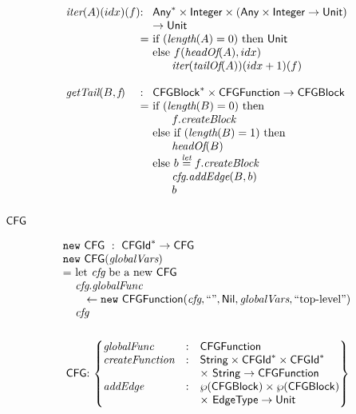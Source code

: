 \vspace*{-2em}
\[
\begin{array}{l@{}l@{~}l}
\iter(A)(idx)(f) & : & \Any^{*} \times \Integer \times (\Any \times \Integer \rightarrow \Unit)\\
&& \rightarrow \Unit\\
& = & \mbox{if}\ (\length(A) = 0)\ \mbox{then}\ \Unit \\
& & \mbox{else}\ f(\headOf(A), idx)\\
& & \phantom{else} \iter(\tailOf(A))(idx+1)(f)\\
& & \\

\getTail(B, \emph{f})\ & : & \CFGBlock^{*} \times  \CFGFunction \rightarrow \CFGBlock \\
& = & \mbox{if}\ (\length(B) = 0)\ \mbox{then}\\
& & \phantom{else} f.\emph{createBlock}\\
& & \mbox{else}\ \mbox{if}\ (\length(B) = 1)\ \mbox{then}\\
& & \phantom{else} \headOf(B) \\
& & \mbox{else}\ b \letval f.\emph{createBlock}\\
& & \phantom{else} \emph{cfg}.\emph{addEdge}(B, b)\\
& & \phantom{else} b\\
\end{array}
\]

\subsubsection{$\mbox{\textsf{CFG}}$}
\[
\begin{array}{l@{}l@{~}l}
\lefteqn{\new\ \CFG \ : \ \CFGId^{*} \rightarrow \CFG} \\
\lefteqn{\new\ \CFG(\emph{globalVars})}\\
& = & \text{let } \emph{cfg} \text{ be a new } \CFG\\
& & \emph{cfg}.\emph{globalFunc} \\
& & \quad \leftarrow \new\ \CFGFunction(\emph{cfg}, ``", \Nil, \emph{globalVars}, ``\text{top-level}")\\
& & \emph{cfg}\\
& & \\
\end{array}
\]
\[
\begin{array}{@{~}r@{~}l@{}l@{~}l}
& \CFG & : &
\begin{Bmatrix*}[l]
\emph{globalFunc} & : & \SF{CFGFunction}\\
\emph{createFunction} & : & \String \times \CFGId^{*} \times \CFGId^{*} \\
&&\times\ \String \rightarrow \CFGFunction \\
\emph{addEdge} & : & \powerset{\CFGBlock} \times \powerset{\CFGBlock}\\
&& \times\ \EdgeType \rightarrow \Unit
\end{Bmatrix*}
\end{array}
\]

